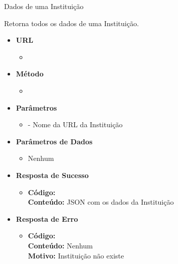 
\begin{caixa}{Dados de uma Instituição}{}

Retorna todos os dados de uma Instituição.

\begin{itemize}
\item \textbf{URL}
	\begin{itemize}
		\item {}
	\end{itemize}

\item \textbf{Método}
	\begin{itemize}
		\item {}
	\end{itemize}

\item \textbf{Parâmetros}
	\begin{itemize}
		\item {} - Nome da URL da Instituição
	\end{itemize}

\item \textbf{Parâmetros de Dados}
	\begin{itemize}
		\item Nenhum
	\end{itemize}

\item \textbf{Resposta de Sucesso}
	\begin{itemize}
		\item \textbf{Código:}  \\ \textbf{Conteúdo:} JSON com os dados da Instituição
	\end{itemize}

\item \textbf{Resposta de Erro}
	\begin{itemize}
		\item \textbf{Código:}  \\ \textbf{Conteúdo:} Nenhum \\ \textbf{Motivo:} Instituição não existe
	\end{itemize}

\end{itemize}
\end{caixa}

